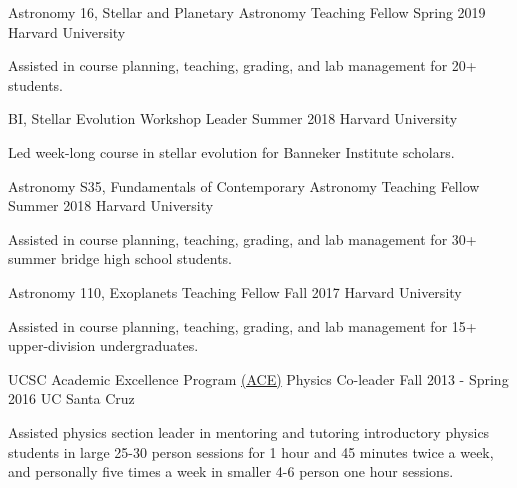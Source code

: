 \begin{cventries}
  \cventry
    {Astronomy 16, Stellar and Planetary Astronomy} %
    {Teaching Fellow} %
    {Spring 2019} %
    {Harvard University} %
    {
        \begin{cvitems} %
            \item[] Assisted in course planning, teaching, grading, and lab management for 20+ students.
        \end{cvitems}
    }
    
  \cventry
    {BI, Stellar Evolution} %
    {Workshop Leader} %
    {Summer 2018} %
    {Harvard University} %
    {
        \begin{cvitems} %
            \item[] Led week-long course in stellar evolution for Banneker Institute scholars.
        \end{cvitems}
    }
    
  \cventry
    {Astronomy S35, Fundamentals of Contemporary Astronomy} %
    {Teaching Fellow} %
    {Summer 2018} %
    {Harvard University} %
    {
        \begin{cvitems} %
            \item[] Assisted in course planning, teaching, grading, and lab management for 30+ summer bridge high school students.
        \end{cvitems}
    }
    
  \cventry
    {Astronomy 110, Exoplanets} %
    {Teaching Fellow} %
    {Fall 2017} %
    {Harvard University} %
    {
        \begin{cvitems} %
            \item[] Assisted in course planning, teaching, grading, and lab management for 15+ upper-division undergraduates.
        \end{cvitems}
    }

    
  \cventry
    {UCSC Academic Excellence Program \href{https://ace.ucsc.edu/}{(ACE)}} %
    {Physics Co-leader} %
    {Fall 2013 - Spring 2016} %
    {UC Santa Cruz} %
    {
        \begin{cvitems} %
            \item[] Assisted physics section leader in mentoring and tutoring introductory physics students in large 25-30 person sessions for 1 hour and 45 minutes twice a week, and personally five times a week in smaller 4-6 person one hour sessions.
        \end{cvitems}
    }
    
\end{cventries}
